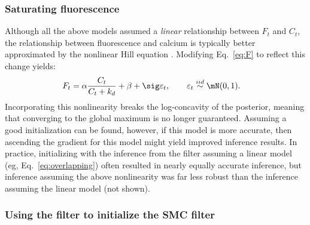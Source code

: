 \subsubsection{Saturating fluorescence}

Although all the above models assumed a \emph{linear} relationship between $F_t$ and $C_t$, the relationship between fluorescence and calcium is typically better approximated by the nonlinear Hill equation \cite{PologrutoSvoboda04}. Modifying Eq.~\eqref{eq:F} to reflect this change yields: 
\begin{align}
	F_t &= \alpha \frac{C_t}{C_t+k_d} + \beta +  \sig \varepsilon_t, \qquad \varepsilon_t \overset{iid}{\sim} \mN(0,1).
\end{align}
Incorporating this nonlinearity breaks the log-concavity of the posterior, meaning that converging to the global maximum is no longer guaranteed.  Assuming a good initialization can be found, however, if this model is more accurate, then ascending the gradient for this model might yield improved inference results.  In practice, initializing with the  inference from the \foopsi filter assuming a linear model (eg, Eq.~\eqref{eq:overlapping}) often resulted in nearly equally accurate inference, but inference assuming the above nonlinearity was far less robust than the inference assuming the linear model (not shown).  

\subsubsection{Using the \foopsi filter to initialize the SMC filter}

